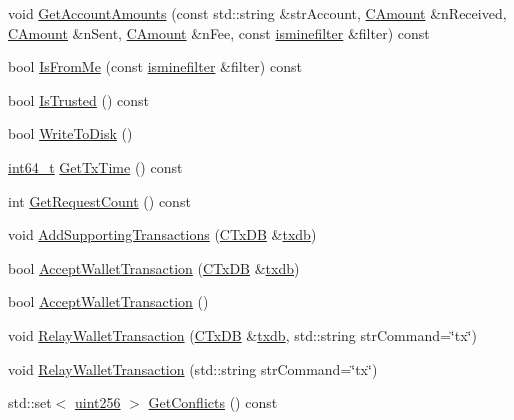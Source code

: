 \begin{DoxyCompactItemize}
\item 
void \hyperlink{class_c_wallet_tx_ae8179fbe6db1204884f0bb7bac4e8fc1}{Get\+Account\+Amounts} (const std\+::string \&str\+Account, \hyperlink{amount_8h_a4eaf3a5239714d8c45b851527f7cb564}{C\+Amount} \&n\+Received, \hyperlink{amount_8h_a4eaf3a5239714d8c45b851527f7cb564}{C\+Amount} \&n\+Sent, \hyperlink{amount_8h_a4eaf3a5239714d8c45b851527f7cb564}{C\+Amount} \&n\+Fee, const \hyperlink{script_8h_aaa5e1639d76aef50f70532acc3302c4b}{isminefilter} \&filter) const 
\item 
bool \hyperlink{class_c_wallet_tx_a5eab277896d1b553676316b862e2014b}{Is\+From\+Me} (const \hyperlink{script_8h_aaa5e1639d76aef50f70532acc3302c4b}{isminefilter} \&filter) const 
\item 
bool \hyperlink{class_c_wallet_tx_af2eff3b849af124cdf869fc03f587972}{Is\+Trusted} () const 
\item 
bool \hyperlink{class_c_wallet_tx_ada0e71d717dd360faf047de54eef4942}{Write\+To\+Disk} ()
\item 
\hyperlink{stdint_8h_adec1df1b8b51cb32b77e5b86fff46471}{int64\+\_\+t} \hyperlink{class_c_wallet_tx_a25fdd940fcdd2ea9d05547c5c789fc0d}{Get\+Tx\+Time} () const 
\item 
int \hyperlink{class_c_wallet_tx_a78d48485ea1680bdc3e2ffc03a500164}{Get\+Request\+Count} () const 
\item 
void \hyperlink{class_c_wallet_tx_a3594f3eabada273c1eb9ab25da38d204}{Add\+Supporting\+Transactions} (\hyperlink{class_c_tx_d_b}{C\+Tx\+D\+B} \&\hyperlink{txdb-leveldb_8cpp_a72eff8ae1d84de13daf97a61b8c02bc6}{txdb})
\item 
bool \hyperlink{class_c_wallet_tx_af6d1a5a731bb69e1d94de84eb6fd15a5}{Accept\+Wallet\+Transaction} (\hyperlink{class_c_tx_d_b}{C\+Tx\+D\+B} \&\hyperlink{txdb-leveldb_8cpp_a72eff8ae1d84de13daf97a61b8c02bc6}{txdb})
\item 
bool \hyperlink{class_c_wallet_tx_aae2016163fb0bd7f0e1464d381ab8293}{Accept\+Wallet\+Transaction} ()
\item 
void \hyperlink{class_c_wallet_tx_aec8c50f3fcde27525485b6cd4a4e19b5}{Relay\+Wallet\+Transaction} (\hyperlink{class_c_tx_d_b}{C\+Tx\+D\+B} \&\hyperlink{txdb-leveldb_8cpp_a72eff8ae1d84de13daf97a61b8c02bc6}{txdb}, std\+::string str\+Command=\char`\"{}tx\char`\"{})
\item 
void \hyperlink{class_c_wallet_tx_a1eac2a5eea87ed88b73777bea5c733b6}{Relay\+Wallet\+Transaction} (std\+::string str\+Command=\char`\"{}tx\char`\"{})
\item 
std\+::set$<$ \hyperlink{classuint256}{uint256} $>$ \hyperlink{class_c_wallet_tx_ab1820e97b0ed6b80763d61e232d0afaa}{Get\+Conflicts} () const 
\end{DoxyCompactItemize}
